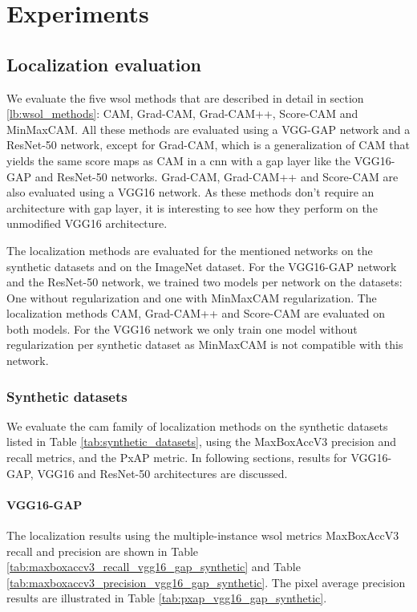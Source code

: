 \chapter{Experiments} \label{ch:experiments}

\section{Localization evaluation}
We evaluate the five \acrshort{wsol} methods that are described in detail in section \ref{lb:wsol_methods}: CAM, Grad-CAM, Grad-CAM++, Score-CAM and MinMaxCAM. All these methods are evaluated using a VGG-GAP network and a ResNet-50 network, except for Grad-CAM, which is a generalization of CAM that yields the same score maps as CAM in a \acrshort{cnn} with a \acrshort{gap} layer like the VGG16-GAP and ResNet-50 networks. Grad-CAM, Grad-CAM++ and Score-CAM are also evaluated using a VGG16 network. As these methods don't require an architecture with \acrshort{gap} layer, it is interesting to see how they perform on the unmodified VGG16 architecture.

The localization methods are evaluated for the mentioned networks on the synthetic datasets and on the ImageNet dataset. For the VGG16-GAP network and the ResNet-50 network, we trained two models per network on the datasets: One without regularization and one with MinMaxCAM regularization. The localization methods CAM, Grad-CAM++ and Score-CAM are evaluated on both models. For the VGG16 network we only train one model without regularization per synthetic dataset as MinMaxCAM is not compatible with this network. 

\subsection{Synthetic datasets}
We evaluate the \acrshort{cam} family of localization methods on the synthetic datasets listed in Table \ref{tab:synthetic_datasets}, using the MaxBoxAccV3 precision and recall metrics, and the PxAP metric. In following sections, results for VGG16-GAP, VGG16 and ResNet-50 architectures are discussed.

\subsubsection{VGG16-GAP}
The localization results using the multiple-instance \acrshort{wsol} metrics MaxBoxAccV3 recall and precision are shown in Table \ref{tab:maxboxaccv3_recall_vgg16_gap_synthetic} and Table \ref{tab:maxboxaccv3_precision_vgg16_gap_synthetic}. The pixel average precision results are illustrated in Table \ref{tab:pxap_vgg16_gap_synthetic}. 

